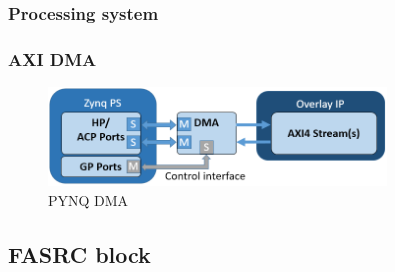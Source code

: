 \subsubsection{Processing system}

\subsubsection{AXI DMA}
\begin{figure}[H]
    \centering
    \includegraphics[width=0.8\textwidth]{figures/dma.png}
    \caption{PYNQ DMA}
    \label{fig:pynq_dma}
\end{figure}





\subsection{FASRC block}



